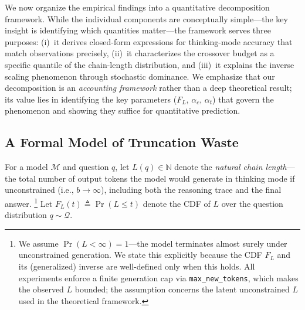 
We now organize the empirical findings into a quantitative decomposition
framework.
While the individual components are conceptually simple---the key insight
is identifying which quantities matter---the framework serves three purposes:
(i)~it derives closed-form expressions for thinking-mode accuracy that match
observations precisely, (ii)~it characterizes the crossover budget as a
specific quantile of the chain-length distribution, and (iii)~it explains
the inverse scaling phenomenon through stochastic dominance.
We emphasize that our decomposition is an \emph{accounting framework} rather
than a deep theoretical result; its value lies in identifying the key parameters
($F_L$, $\alpha_c$, $\alpha_t$) that govern the phenomenon and showing they
suffice for quantitative prediction.

\subsection{A Formal Model of Truncation Waste}
\label{sec:theory:truncation}

\begin{definition}
\label{def:chain-length}
For a model $\mathcal{M}$ and question $q$, let $L(q) \in \mathbb{N}$
denote the \emph{natural chain length}---the total number of output tokens
the model would generate in thinking mode if unconstrained
(i.e., $b \to \infty$), including both the reasoning trace and the
final answer.%
\footnote{We assume $\Pr(L < \infty) = 1$---the model terminates
almost surely under unconstrained generation.
We state this explicitly because the
CDF $F_L$ and its (generalized) inverse are well-defined only when
this holds.
All experiments enforce a finite generation cap via
\texttt{max\_new\_tokens}, which makes the observed $L$ bounded;
the assumption concerns the latent unconstrained $L$ used in the
theoretical framework.}
Let $F_L(t) \triangleq \Pr(L \le t)$ denote the CDF of $L$ over the
question distribution $q \sim \mathcal{Q}$.
\end{definition}

